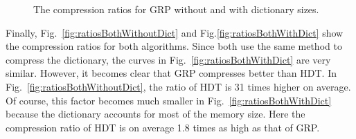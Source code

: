 \begin{figure}[h]
	\centering
	\hfill
	\caption{The compression ratios for GRP without and with dictionary sizes.}
\end{figure}

Finally, Fig.~\ref{fig:ratiosBothWithoutDict} and Fig.\ref{fig:ratiosBothWithDict} show the compression ratios for both algorithms. Since both use the same method to compress the dictionary, the curves in Fig.~\ref{fig:ratiosBothWithDict} are very similar. However, it becomes clear that GRP compresses better than HDT. In Fig.~\ref{fig:ratiosBothWithoutDict}, the ratio of HDT is 31 times higher on average. Of course, this factor becomes much smaller in Fig.~\ref{fig:ratiosBothWithDict} because the dictionary accounts for most of the memory size. Here the compression ratio of HDT is on average 1.8 times as high as that of GRP.

